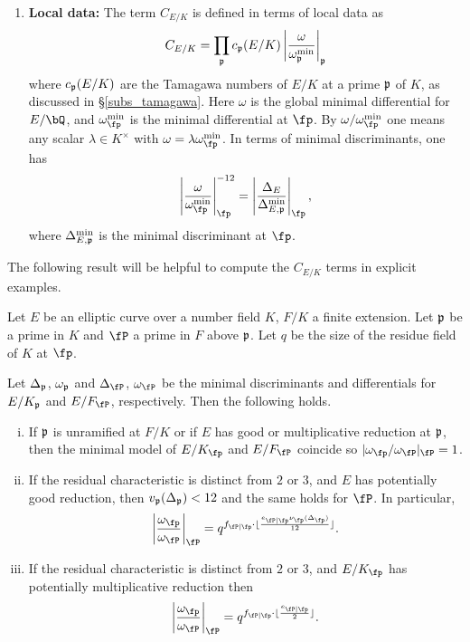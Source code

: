 \begin{enumerate}
    \item \textbf{Local data:} The term $C_{E/K}$ is defined in terms of local data as 
    \begin{equation}\label{fudge-factor}
    C_{E/K}=\prod_{\mathfrak{p}}c_{\mathfrak{p}}(E/K)\left|\frac{\omega}{\omega_{\mathfrak{p}}^{\min}}\right|_{\mathfrak{p}}
    \end{equation}
    where $c_{\mathfrak{p}}(E/K)$ are the Tamagawa numbers of $E/K$ at a prime $\mathfrak{p}$ of $K$, as discussed in \S\ref*{subs_tamagawa}.
    Here $\omega$ is the global minimal differential for $E / \bQ$, and $\omega_{\fp}^{\min}$ is the minimal differential at $\fp$. By $\omega / \omega_{\fp}^{\min}$ one means any scalar $\lambda \in K^{\times}$ with $\omega = \lambda \omega_{\fp}^{\min}$. In terms of minimal discriminants, one has
    \[ \left| \frac{\omega}{\omega_{\fp}^{\min}} \right|_{\fp}^{-12} = \left|\frac{\Delta_E}{\Delta_{E, \pp}^{\min}} \right|_{\fp}, \]
    where $\Delta_{E, \mathfrak{p}}^{\min}$ is the minimal discriminant at $\fp$.    
\end{enumerate}

The following result will be helpful to compute the $C_{E / K}$ terms in explicit examples.

    \begin{lemma}\label{lem_Dterms}
        Let $E$ be an elliptic curve over a number field $K$, $F/K$ a finite extension. Let $\mathfrak{p}$ be a prime in $K$ and $\fP$ a prime in $F$ above $\mathfrak{p}$. Let $q$ be the size of the residue field of $K$ at $\fp$. %

        Let $\Delta_{\mathfrak{p}}$, $\omega_{\mathfrak{p}}$ and $\Delta_\fP$, $\omega_{\fP}$ be the minimal discriminants and differentials for $E/K_{\mathfrak{p}}$ and $E/F_\fP$, respectively. Then the following holds.
        \begin{enumerate}[(i)]
            \setlength\itemsep{0em}
            \item If $\mathfrak{p}$ is unramified at $F/K$ or if $E$ has good or multiplicative reduction at $\mathfrak{p}$, then the minimal model of $E / K_{\fp}$ and $E / F_{\fP}$ coincide so $| \omega_{\fp} / \omega_{\fP} |_{\fP} = 1$. 
            
            \item If the residual characteristic is distinct from $2$ or $3$, and $E$ has potentially good reduction, then $v_{\mathfrak{p}}(\Delta_{\mathfrak{p}})<12$ and the same holds for $\fP$. In particular, 
            $$\left|\frac{\omega_{\fp}}{\omega_{\fP}}\right|_{\fP} = q^{f_{\fP \mid \fp}\cdot\floor{\frac{e_{\fP\mid\fp}\nu_\fp(\Delta_\fp)}{12}}}.$$
            \item If the residual characteristic is distinct from $2$ or $3$, and $E / K_{\fp}$ has potentially multiplicative reduction then 
            $$ \left|\frac{\omega_{\fp}}{\omega_{\fP}}\right|_{\fP} = q^{f_{\fP \mid \fp} \cdot \floor{\frac{e_{\fP \mid \fp}}{2}}}.$$
        \end{enumerate}
    \end{lemma}

